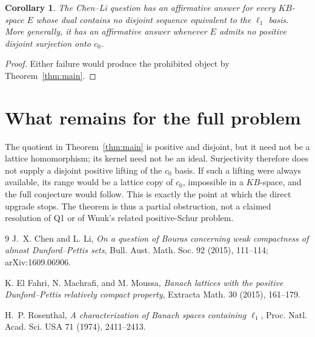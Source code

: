 \documentclass[11pt]{article}
\newtheorem{corollary}[theorem]{Corollary}
\theoremstyle{remark}
\begin{document}
\begin{corollary}\label{cor:criterion}
The Chen--Li question has an affirmative answer for every $KB$-space $E$
whose dual contains no disjoint sequence equivalent to the $\ell_1$ basis.
More generally, it has an affirmative answer whenever $E$ admits no positive
disjoint surjection onto $c_0$.
\end{corollary}

\begin{proof}
Either failure would produce the prohibited object by
Theorem~\ref{thm:main}.
\end{proof}

\section{What remains for the full problem}

The quotient in Theorem~\ref{thm:main} is positive and disjoint, but it need
not be a lattice homomorphism; its kernel need not be an ideal.  Surjectivity
therefore does not supply a disjoint positive lifting of the $c_0$ basis.  If
such a lifting were always available, its range would be a lattice copy of
$c_0$, impossible in a $KB$-space, and the full conjecture would follow.
This is exactly the point at which the direct upgrade stops.  The theorem is
thus a partial obstruction, not a claimed resolution of Q1 or of Wnuk's
related positive-Schur problem.

\begin{thebibliography}{9}
J.~X. Chen and L. Li,
\emph{On a question of Bouras concerning weak compactness of almost
Dunford--Pettis sets}, Bull. Aust. Math. Soc. 92 (2015), 111--114;
arXiv:1609.06906.

K. El Fahri, N. Machrafi, and M. Moussa,
\emph{Banach lattices with the positive Dunford--Pettis relatively compact
property}, Extracta Math. 30 (2015), 161--179.

H.~P. Rosenthal,
\emph{A characterization of Banach spaces containing $\ell_1$},
Proc. Natl. Acad. Sci. USA 71 (1974), 2411--2413.
\end{thebibliography}
\end{document}
